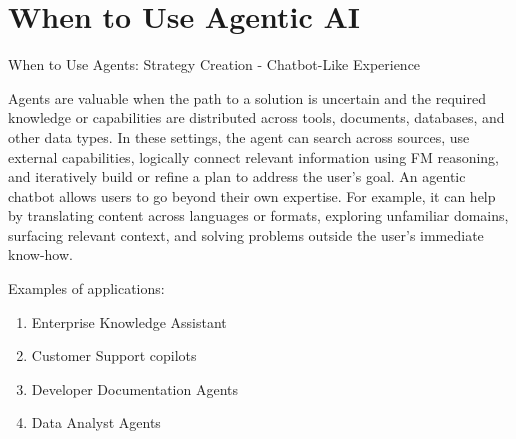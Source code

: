 \section{When to Use Agentic AI}

\begin{frame}{When to Use Agents: Strategy Creation - Chatbot-Like Experience}

Agents are valuable when the path to a solution is uncertain and the required knowledge or capabilities are distributed across tools, documents, databases, and other data types. In these settings, the agent can search across sources, use external capabilities, logically connect relevant information using FM reasoning, and iteratively build or refine a plan to address the user's goal.
An agentic chatbot allows users to go beyond their own expertise. For example, it can help by translating content across languages or formats, exploring unfamiliar domains, surfacing relevant context, and solving problems outside the user's immediate know-how.

\vspace{0.6em}

Examples of applications:

\begin{enumerate}
  \item Enterprise Knowledge Assistant
  \item Customer Support copilots
  \item Developer Documentation Agents
  \item Data Analyst Agents
\end{enumerate}
\end{frame}


